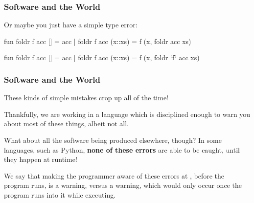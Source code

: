 \documentclass[aspectratio=169]{beamer}
\newcommand{\cmark}{{\color{green!80!black}\ding{51}}}
\newcommand{\xmark}{{\color{red}\ding{55}}}
\begin{document}
\begin{frame}[fragile]
  \frametitle{Software and the World}

  Or maybe you just have a simple type error:

  \begin{center}
    \begin{minipage}[t][0.8in][t]{\textwidth}
      \begin{minipage}{0.2\textwidth}
        \centering
        \xmark
      \end{minipage}
      \begin{minipage}{0.75\textwidth}
        {\small
          \begin{codeblock}[rulecolor=\color{red}, framerule=0.3mm]
            fun foldr f acc [] = acc
              | foldr f acc (x::xs) =
                  f (x, foldr acc xs)
          \end{codeblock}
          }
        \end{minipage}
    \end{minipage}
    \begin{minipage}[t][0.8in][t]{\textwidth}
      \begin{minipage}{0.2\textwidth}
        \centering
        \cmark
      \end{minipage}
      \begin{minipage}{0.75\textwidth}
        {\small
        \begin{codeblock}[rulecolor=\color{green!80!black}, framerule=0.3mm]
          fun foldr f acc [] = acc
            | foldr f acc (x::xs) =
                f (x, foldr `f` acc xs)
        \end{codeblock}
        }
      \end{minipage}
    \end{minipage}
  \end{center}
\end{frame}

\begin{frame}[fragile]
  \frametitle{Software and the World}

  These kinds of simple mistakes crop up all of the time!

  Thankfully, we are working in a language which is disciplined enough
  to warn you about most of these things, albeit not all.

  What about all the software being produced elsewhere, though? In some languages,
  such as Python, \textbf{none of these errors} are able to be caught, until they
  happen at runtime!

  We say that making the programmer aware of these errors at ,
  before the program runs, is a  warning, versus a 
  warning, which would only occur once the program runs into it while executing.
\end{frame}
\end{document}
